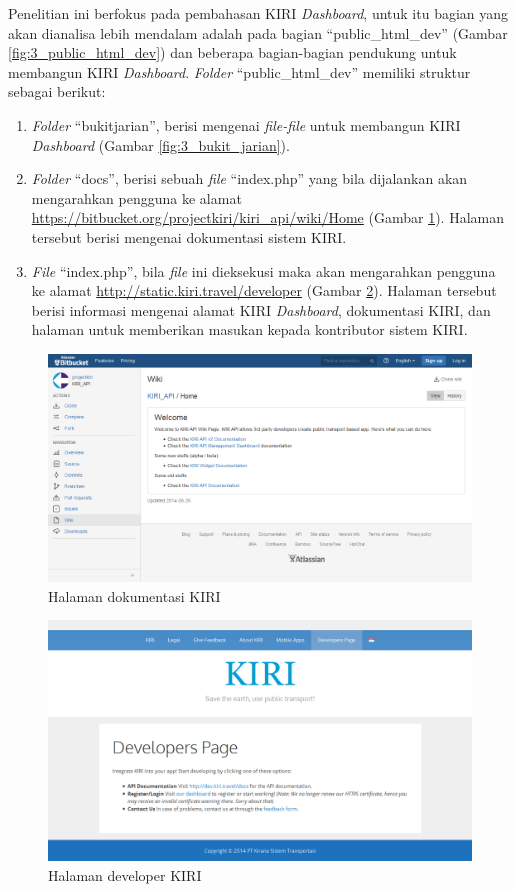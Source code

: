 Penelitian ini berfokus pada pembahasan KIRI \textit{Dashboard}, untuk itu bagian yang akan dianalisa lebih mendalam adalah pada bagian ``public\_html\_dev'' (Gambar \ref{fig:3_public_html_dev}) dan beberapa bagian-bagian pendukung untuk membangun KIRI \textit{Dashboard}. \textit{Folder} ``public\_html\_dev'' memiliki struktur sebagai berikut:
\begin{enumerate}
	\item \textit{Folder} ``bukitjarian'', berisi mengenai \textit{file-file} untuk membangun KIRI \textit{Dashboard} (Gambar \ref{fig:3_bukit_jarian}).
	\item \textit{Folder} ``docs'', berisi sebuah \textit{file} ``index.php'' yang bila dijalankan akan mengarahkan pengguna ke alamat \url{https://bitbucket.org/projectkiri/kiri_api/wiki/Home} (Gambar \ref{fig:3_dokumentasi}). Halaman tersebut berisi mengenai dokumentasi sistem KIRI.
	\item \textit{File} ``index.php'', bila \textit{file} ini dieksekusi maka akan mengarahkan pengguna ke alamat \url{http://static.kiri.travel/developer} (Gambar \ref{fig:3_developer}). Halaman tersebut berisi informasi mengenai alamat KIRI \textit{Dashboard}, dokumentasi KIRI, dan halaman untuk memberikan masukan kepada kontributor sistem KIRI.
\end{enumerate}

\begin{figure}[htbp]
	\centering
		\includegraphics[scale=0.35]{Gambar/3_dokumentasi.png}
	\caption{Halaman dokumentasi KIRI}
	\label{fig:3_dokumentasi}
\end{figure}

\begin{figure}[htbp]
	\centering
		\includegraphics[scale=0.35]{Gambar/3_developer.png}
	\caption{Halaman developer KIRI}
	\label{fig:3_developer}
\end{figure}

